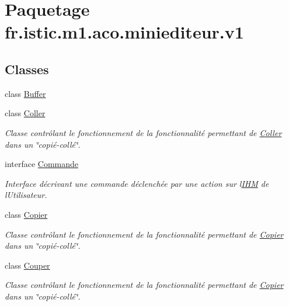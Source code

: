 \hypertarget{namespacefr_1_1istic_1_1m1_1_1aco_1_1miniediteur_1_1v1}{}\section{Paquetage fr.\+istic.\+m1.\+aco.\+miniediteur.\+v1}
\label{namespacefr_1_1istic_1_1m1_1_1aco_1_1miniediteur_1_1v1}
\subsection*{Classes}
\begin{DoxyCompactItemize}
\item 
class \hyperlink{classfr_1_1istic_1_1m1_1_1aco_1_1miniediteur_1_1v1_1_1Buffer}{Buffer}
\item 
class \hyperlink{classfr_1_1istic_1_1m1_1_1aco_1_1miniediteur_1_1v1_1_1Coller}{Coller}
\begin{DoxyCompactList}\small\item\em Classe contrôlant le fonctionnement de la fonctionnalité permettant de \hyperlink{classfr_1_1istic_1_1m1_1_1aco_1_1miniediteur_1_1v1_1_1Coller}{Coller} dans un \char`\"{}copié-\/collé\char`\"{}. \end{DoxyCompactList}\item 
interface \hyperlink{interfacefr_1_1istic_1_1m1_1_1aco_1_1miniediteur_1_1v1_1_1Commande}{Commande}
\begin{DoxyCompactList}\small\item\em Interface décrivant une commande déclenchée par une action sur l\textquotesingle{}\hyperlink{interfacefr_1_1istic_1_1m1_1_1aco_1_1miniediteur_1_1v1_1_1IHM}{I\+HM} de l\textquotesingle{}Utilisateur. \end{DoxyCompactList}\item 
class \hyperlink{classfr_1_1istic_1_1m1_1_1aco_1_1miniediteur_1_1v1_1_1Copier}{Copier}
\begin{DoxyCompactList}\small\item\em Classe contrôlant le fonctionnement de la fonctionnalité permettant de \hyperlink{classfr_1_1istic_1_1m1_1_1aco_1_1miniediteur_1_1v1_1_1Copier}{Copier} dans un \char`\"{}copié-\/collé\char`\"{}. \end{DoxyCompactList}\item 
class \hyperlink{classfr_1_1istic_1_1m1_1_1aco_1_1miniediteur_1_1v1_1_1Couper}{Couper}
\begin{DoxyCompactList}\small\item\em Classe contrôlant le fonctionnement de la fonctionnalité permettant de \hyperlink{classfr_1_1istic_1_1m1_1_1aco_1_1miniediteur_1_1v1_1_1Copier}{Copier} dans un \char`\"{}copié-\/collé\char`\"{}. \end{DoxyCompactList}\item 

\end{DoxyCompactItemize}
